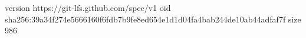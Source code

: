 version https://git-lfs.github.com/spec/v1
oid sha256:39a34f274e5666160f6fdb7b9fe8ed654e1d1d04fa4bab244de10ab44adfaf7f
size 986
